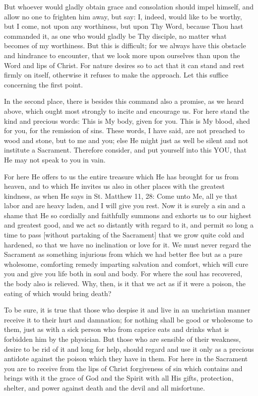 But whoever would gladly obtain grace and consolation should impel
himself, and allow no one to frighten him away, but say: I, indeed,
would like to be worthy, but I come, not upon any worthiness, but upon
Thy Word, because Thou hast commanded it, as one who would gladly be
Thy disciple, no matter what becomes of my worthiness. But this is
difficult; for we always have this obstacle and hindrance to encounter,
that we look more upon ourselves than upon the Word and lips of Christ.
For nature desires so to act that it can stand and rest firmly on
itself, otherwise it refuses to make the approach. Let this suffice
concerning the first point.

In the second place, there is besides this command also a promise, as
we heard above, which ought most strongly to incite and encourage us.
For here stand the kind and precious words: This is My body, given for
you. This is My blood, shed for you, for the remission of sins. These
words, I have said, are not preached to wood and stone, but to me and
you; else He might just as well be silent and not institute a
Sacrament. Therefore consider, and put yourself into this YOU, that He
may not speak to you in vain.

For here He offers to us the entire treasure which He has brought for
us from heaven, and to which He invites us also in other places with
the greatest kindness, as when He says in St. Matthew 11, 28: Come unto
Me, all ye that labor and are heavy laden, and I will give you rest.
Now it is surely a sin and a shame that He so cordially and faithfully
summons and exhorts us to our highest and greatest good, and we act so
distantly with regard to it, and permit so long a time to pass [without
partaking of the Sacrament] that we grow quite cold and hardened, so
that we have no inclination or love for it. We must never regard the
Sacrament as something injurious from which we had better flee but as a
pure wholesome, comforting remedy imparting salvation and comfort,
which will cure you and give you life both in soul and body. For where
the soul has recovered, the body also is relieved. Why, then, is it
that we act as if it were a poison, the eating of which would bring
death?

To be sure, it is true that those who despise it and live in an
unchristian manner receive it to their hurt and damnation; for nothing
shall be good or wholesome to them, just as with a sick person who from
caprice eats and drinks what is forbidden him by the physician. But
those who are sensible of their weakness, desire to be rid of it and
long for help, should regard and use it only as a precious antidote
against the poison which they have in them. For here in the Sacrament
you are to receive from the lips of Christ forgiveness of sin which
contains and brings with it the grace of God and the Spirit with all
His gifts, protection, shelter, and power against death and the devil
and all misfortune.

